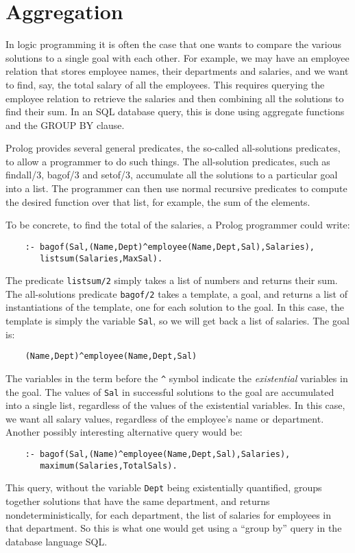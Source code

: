 \chapter{Aggregation}

In logic programming it is often the case that one wants to compare
the various solutions to a single goal with each other.  For example,
we may have an employee relation that stores employee names, their
departments and salaries, and we want to find, say, the total salary
of all the employees.  This requires querying the employee relation to
retrieve the salaries and then combining all the solutions to find
their sum.  In an SQL database query, this is done using aggregate
functions and the GROUP BY clause.

Prolog provides several general predicates, the so-called
all-solutions predicates, to allow a programmer to do such things.
The all-solution predicates, such as findall/3, bagof/3 and setof/3,
accumulate all the solutions to a particular goal into a list. The
programmer can then use normal recursive predicates to compute the
desired function over that list, for example, the sum of the elements.

To be concrete, to find the total of the salaries, a Prolog programmer
could write:
\begin{verbatim}
    :- bagof(Sal,(Name,Dept)^employee(Name,Dept,Sal),Salaries),
       listsum(Salaries,MaxSal).
\end{verbatim}
The predicate \verb|listsum/2| simply takes a list of numbers and
returns their sum.  The all-solutions predicate \verb|bagof/2| takes a
template, a goal, and returns a list of instantiations of the
template, one for each solution to the goal.  In this case, the
template is simply the variable \verb|Sal|, so we will get back a list
of salaries. The goal is:
\begin{verbatim}
    (Name,Dept)^employee(Name,Dept,Sal)
\end{verbatim}
The variables in the term before the \verb|^| symbol indicate the {\em
existential} variables in the goal.  The values of \verb|Sal| in
successful solutions to the goal are accumulated into a single list,
regardless of the values of the existential variables.  In this case,
we want all salary values, regardless of the employee's name or
department.  Another possibly interesting alternative query would be:
\begin{verbatim}
    :- bagof(Sal,(Name)^employee(Name,Dept,Sal),Salaries),
       maximum(Salaries,TotalSals).
\end{verbatim}
This query, without the variable \verb|Dept| being existentially
quantified, groups together solutions that have the same department,
and returns nondeterministically, for each department, the list of
salaries for employees in that department.  So this is what one would
get using a ``group by'' query in the database language SQL.


